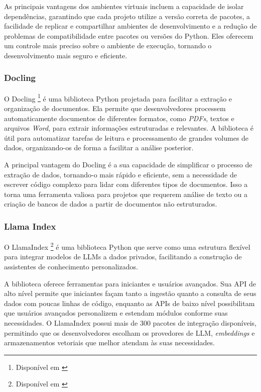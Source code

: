 \documentclass[a4paper, 12pt]{article}
\newcommand{\citeb}[1]{\bibleftbracket\cite{#1}\bibrightbracket}
\begin{document}
    As principais vantagens dos ambientes virtuais incluem a capacidade de isolar dependências, garantindo que cada projeto utilize a versão correta de pacotes, a facilidade de replicar e compartilhar ambientes de desenvolvimento e a redução de problemas de compatibilidade entre pacotes ou versões do Python. Eles oferecem um controle mais preciso sobre o ambiente de execução, tornando o desenvolvimento mais seguro e eficiente.

    \subsubsection{Docling} \label{sec:docling}

    O Docling \footnote{Disponível em \citeb{docling}} é uma biblioteca Python projetada para facilitar a extração e organização de documentos. Ela permite que desenvolvedores processem automaticamente documentos de diferentes formatos, como \textit{PDFs}, textos e arquivos \textit{Word}, para extrair informações estruturadas e relevantes. A biblioteca é útil para automatizar tarefas de leitura e processamento de grandes volumes de dados, organizando-os de forma a facilitar a análise posterior.

    A principal vantagem do Docling é a sua capacidade de simplificar o processo de extração de dados, tornando-o mais rápido e eficiente, sem a necessidade de escrever código complexo para lidar com diferentes tipos de documentos. Isso a torna uma ferramenta valiosa para projetos que requerem análise de texto ou a criação de bancos de dados a partir de documentos não estruturados.

    \subsubsection{Llama Index} \label{sec:llama_index}

    O LlamaIndex \footnote{Disponível em \citeb{llama_index}} é uma biblioteca Python que serve como uma estrutura flexível para integrar modelos de LLMs a dados privados, facilitando a construção de assistentes de conhecimento personalizados.

    A biblioteca oferece ferramentas para iniciantes e usuários avançados. Sua API de alto nível permite que iniciantes façam tanto a ingestão quanto a consulta de seus dados com poucas linhas de código, enquanto as APIs de baixo nível possibilitam que usuários avançados personalizem e estendam módulos conforme suas necessidades. O LlamaIndex possui mais de 300 pacotes de integração disponíveis, permitindo que os desenvolvedores escolham os provedores de LLM, \textit{embeddings} e armazenamentos vetoriais que melhor atendam às suas necessidades.
\end{document}
